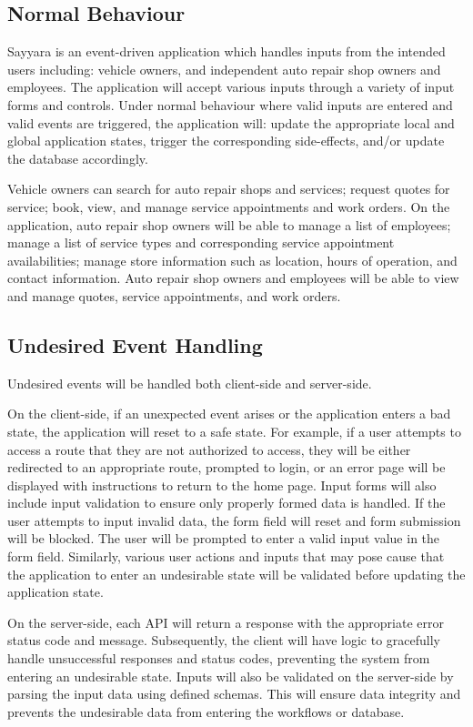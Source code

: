 \documentclass[12pt, titlepage]{article}
\begin{document}
\subsection{Normal Behaviour}
Sayyara is an event-driven application which handles inputs from the intended users including:
vehicle owners, and independent auto repair shop owners and employees. The application will accept
various inputs through a variety of input forms and controls. Under normal behaviour where valid
inputs are entered and valid events are triggered, the application will: update the appropriate
local and global application states, trigger the corresponding side-effects, and/or update the
database accordingly.

Vehicle owners can search for auto repair shops and services; request quotes for service; book,
view, and manage service appointments and work orders. On the application, auto repair shop owners
will be able to manage a list of employees; manage a list of service types and corresponding
service appointment availabilities; manage store information such as location, hours of operation,
and contact information. Auto repair shop owners and employees will be able to view and manage
quotes, service appointments, and work orders.

\subsection{Undesired Event Handling}

Undesired events will be handled both client-side and server-side.

On the client-side, if an unexpected event arises or the application enters a bad state, the
application will reset to a safe state. For example, if a user attempts to access a route that they
are not authorized to access, they will be either redirected to an appropriate route, prompted to
login, or an error page will be displayed with instructions to return to the home page. Input forms
will also include input validation to ensure only properly formed data is handled. If the user
attempts to input invalid data, the form field will reset and form submission will be blocked. The
user will be prompted to enter a valid input value in the form field. Similarly, various user
actions and inputs that may pose cause that the application to enter an undesirable state will be
validated before updating the application state.

On the server-side, each API will return a response with the appropriate error status code and
message. Subsequently, the client will have logic to gracefully handle unsuccessful responses and
status codes, preventing the system from entering an undesirable state. Inputs will also be
validated on the server-side by parsing the input data using defined schemas. This will ensure data
integrity and prevents the undesirable data from entering the workflows or database.
\end{document}

